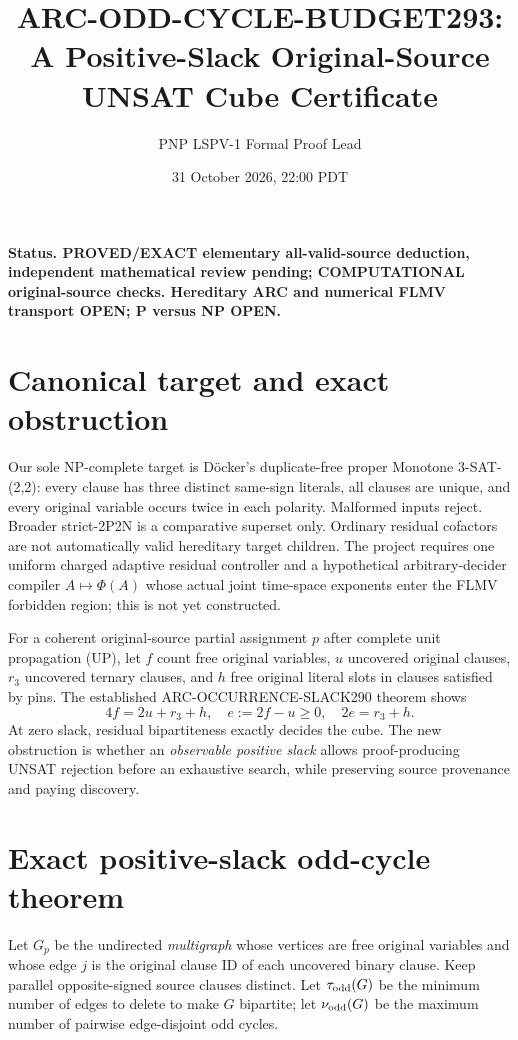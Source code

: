 \documentclass[11pt]{article}
\title{ARC-ODD-CYCLE-BUDGET293: A Positive-Slack Original-Source UNSAT Cube Certificate}
\author{PNP LSPV-1 Formal Proof Lead}
\date{31 October 2026, 22:00 PDT}
\begin{document}
\maketitle
\noindent\textbf{Status. PROVED/EXACT elementary all-valid-source deduction, independent mathematical review pending; COMPUTATIONAL original-source checks. Hereditary ARC and numerical FLMV transport OPEN; P versus NP OPEN.}

\section{Canonical target and exact obstruction}
Our sole NP-complete target is D\"ocker's duplicate-free proper Monotone 3-SAT-(2,2): every clause has three distinct same-sign literals, all clauses are unique, and every original variable occurs twice in each polarity. Malformed inputs reject. Broader strict-2P2N is a comparative superset only. Ordinary residual cofactors are not automatically valid hereditary target children. The project requires one uniform charged adaptive residual controller and a hypothetical arbitrary-decider compiler $A\mapsto\Phi(A)$ whose actual joint time-space exponents enter the FLMV forbidden region; this is not yet constructed.

For a coherent original-source partial assignment $p$ after complete unit propagation (UP), let $f$ count free original variables, $u$ uncovered original clauses, $r_3$ uncovered ternary clauses, and $h$ free original literal slots in clauses satisfied by pins. The established ARC-OCCURRENCE-SLACK290 theorem shows
\[
4f=2u+r_3+h,\quad e:=2f-u\ge0,\quad 2e=r_3+h.
\]
At zero slack, residual bipartiteness exactly decides the cube. The new obstruction is whether an \emph{observable positive slack} allows proof-producing UNSAT rejection before an exhaustive search, while preserving source provenance and paying discovery.

\section{Exact positive-slack odd-cycle theorem}
Let $G_p$ be the undirected \emph{multigraph} whose vertices are free original variables and whose edge $j$ is the original clause ID of each uncovered binary clause. Keep parallel opposite-signed source clauses distinct. Let $\tau_{\rm odd}(G)$ be the minimum number of edges to delete to make $G$ bipartite; let $\nu_{\rm odd}(G)$ be the maximum number of pairwise edge-disjoint odd cycles.
\end{document}
